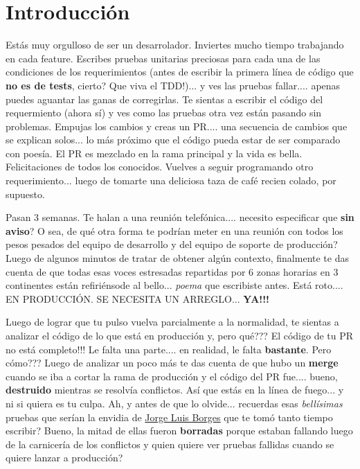 
\section{Introducción}

Estás muy orgulloso de ser un desarrolador. Inviertes mucho tiempo trabajando en cada feature. Escribes
pruebas unitarias preciosas para cada una de las condiciones de los requerimientos (antes de escribir
la primera línea de código que {\bf no es de tests}, cierto? Que viva el TDD!)... y ves las pruebas fallar....
apenas puedes aguantar las ganas de corregirlas. Te sientas a escribir el código del requermiento (ahora sí)
y ves como las pruebas otra vez están pasando sin problemas. Empujas los cambios y creas un PR.... una secuencia
de cambios que se explican solos... lo más próximo que el código pueda estar de ser comparado con poesía. El PR
es mezclado en la rama principal y la vida es bella. Felicitaciones de todos los conocidos. Vuelves a seguir
programando otro requerimiento... luego de tomarte una deliciosa taza de café recien colado, por supuesto.

Pasan 3 semanas. Te halan a una reunión telefónica.... necesito especificar que {\bf sin aviso}? O sea, de qué otra forma
te podrían meter en una reunión con todos los pesos pesados del equipo de desarrollo y del equipo de soporte de producción?
Luego de algunos minutos de tratar de obtener algún contexto, finalmente te das cuenta de que todas esas voces estresadas
repartidas por 6 zonas horarias en 3 continentes están refiriénsode al bello... {\it poema} que escribiste antes.
Está roto.... EN PRODUCCIÓN. SE NECESITA UN ARREGLO... {\bf YA!!!}

Luego de lograr que tu pulso vuelva parcialmente a la normalidad, te sientas a analizar el código de lo que está en
producción y, pero qué??? El código de tu PR no está completo!!! Le falta una parte.... en realidad, le falta {\bf bastante}.
Pero cómo??? Luego de analizar un poco más te das cuenta de que hubo un {\bf merge} cuando se iba a cortar la rama
de producción y el código del PR fue.... bueno, {\bf destruido} mientras se resolvía conflictos. Así que estás
en la línea de fuego... y ni si quiera es tu culpa. Ah, y antes de que lo olvide... recuerdas esas {\it bellísimas}
pruebas que serían la envidia de \href{https://es.wikipedia.org/wiki/Jorge_Luis_Borges}{Jorge Luis Borges} que te tomó tanto
tiempo escribir? Bueno, la mitad de ellas fueron {\bf borradas} porque estaban fallando luego
de la carnicería de los conflictos y quien quiere ver pruebas fallidas cuando se quiere lanzar a producción?

